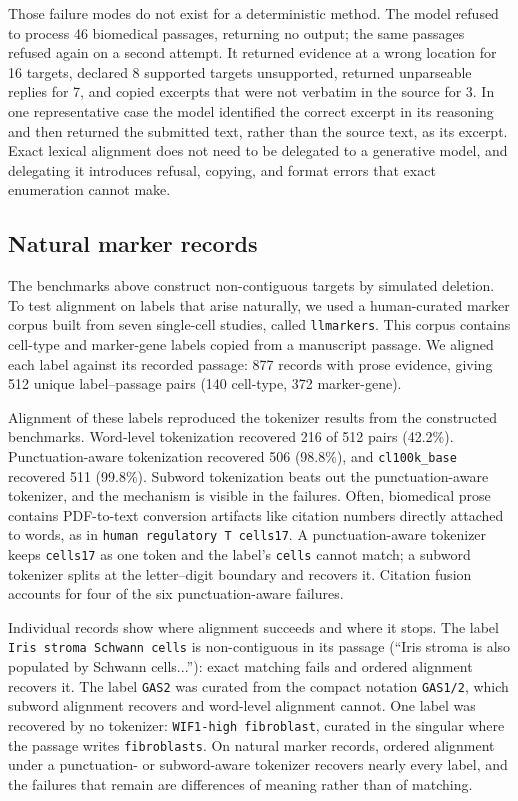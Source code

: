 \documentclass[pdflatex,lineno,referee,sn-vancouver-num]{sn-jnl}
\theoremstyle{thmstyleone}
\theoremstyle{thmstylethree}
\theoremstyle{thmstyletwo}
\begin{document}
Those failure modes do not exist for a deterministic method. The model refused to process 46 biomedical passages, returning no output; the same passages refused again on a second attempt. It returned evidence at a wrong location for 16 targets, declared 8 supported targets unsupported, returned unparseable replies for 7, and copied excerpts that were not verbatim in the source for 3. In one representative case the model identified the correct excerpt in its reasoning and then returned the submitted text, rather than the source text, as its excerpt. Exact lexical alignment does not need to be delegated to a generative model, and delegating it introduces refusal, copying, and format errors that exact enumeration cannot make.

\subsection{Natural marker records}
The benchmarks above construct non-contiguous targets by simulated deletion. To test alignment on labels that arise naturally, we used a human-curated marker corpus built from seven single-cell studies, called \texttt{llmarkers}. This corpus contains cell-type and marker-gene labels copied from a manuscript passage. We aligned each label against its recorded passage: 877 records with prose evidence, giving 512 unique label--passage pairs (140 cell-type, 372 marker-gene).

Alignment of these labels reproduced the tokenizer results from the constructed benchmarks. Word-level tokenization recovered 216 of 512 pairs (42.2\%). Punctuation-aware tokenization recovered 506 (98.8\%), and \texttt{cl100k\_base} recovered 511 (99.8\%). Subword tokenization beats out the punctuation-aware tokenizer, and the mechanism is visible in the failures. Often, biomedical prose contains PDF-to-text conversion artifacts like citation numbers directly attached to words, as in \texttt{human regulatory T cells17}. A punctuation-aware tokenizer keeps \texttt{cells17} as one token and the label's \texttt{cells} cannot match; a subword tokenizer splits at the letter--digit boundary and recovers it. Citation fusion accounts for four of the six punctuation-aware failures.

Individual records show where alignment succeeds and where it stops. The label \texttt{Iris stroma Schwann cells} is non-contiguous in its passage (``Iris stroma is also populated by Schwann cells...''): exact matching fails and ordered alignment recovers it. The label \texttt{GAS2} was curated from the compact notation \texttt{GAS1/2}, which subword alignment recovers and word-level alignment cannot. One label was recovered by no tokenizer: \texttt{WIF1-high fibroblast}, curated in the singular where the passage writes \texttt{fibroblasts}. On natural marker records, ordered alignment under a punctuation- or subword-aware tokenizer recovers nearly every label, and the failures that remain are differences of meaning rather than of matching.
\end{document}
